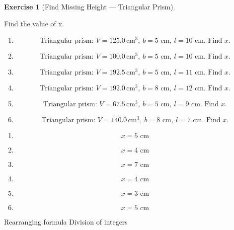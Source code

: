 \documentclass[
  letterpaper,
  DIV=11,
  numbers=noendperiod]{scrreprt}
\theoremstyle{definition}
\newtheorem{exercise}{Exercise}[chapter]
\theoremstyle{remark}
\begin{document}
\begin{exercise}[Find Missing Height --- Triangular
Prism]\protect\hypertarget{exr-comp-9}{}\label{exr-comp-9}

Find the value of x.

\begin{enumerate}
\def\labelenumi{\alph{enumi})}
\item
  \[\text{Triangular prism: }V=125.0\,\text{cm}^{3},\ b=5\text{ cm},\ l=10\text{ cm. Find }x.\]
\item
  \[\text{Triangular prism: }V=100.0\,\text{cm}^{3},\ b=5\text{ cm},\ l=10\text{ cm. Find }x.\]
\item
  \[\text{Triangular prism: }V=192.5\,\text{cm}^{3},\ b=5\text{ cm},\ l=11\text{ cm. Find }x.\]
\item
  \[\text{Triangular prism: }V=192.0\,\text{cm}^{3},\ b=8\text{ cm},\ l=12\text{ cm. Find }x.\]
\item
  \[\text{Triangular prism: }V=67.5\,\text{cm}^{3},\ b=5\text{ cm},\ l=9\text{ cm. Find }x.\]
\item
  \[\text{Triangular prism: }V=140.0\,\text{cm}^{3},\ b=8\text{ cm},\ l=7\text{ cm. Find }x.\]
\end{enumerate}

\begin{tcolorbox}[enhanced jigsaw, opacitybacktitle=0.6, coltitle=black, arc=.35mm, colframe=quarto-callout-tip-color-frame, colback=white, bottomrule=.15mm, left=2mm, colbacktitle=quarto-callout-tip-color!10!white, titlerule=0mm, opacityback=0, title=\textcolor{quarto-callout-tip-color}{\faLightbulb}\hspace{0.5em}{🔍 View Solution}, leftrule=.75mm, breakable, rightrule=.15mm, bottomtitle=1mm, toptitle=1mm, toprule=.15mm]

\begin{enumerate}
\def\labelenumi{\alph{enumi})}
\item
  \[x=5\text{ cm}\]
\item
  \[x=4\text{ cm}\]
\item
  \[x=7\text{ cm}\]
\item
  \[x=4\text{ cm}\]
\item
  \[x=3\text{ cm}\]
\item
  \[x=5\text{ cm}\]
\end{enumerate}

\end{tcolorbox}

{Rearranging formula} {Division of integers}

\end{exercise}
\end{document}
